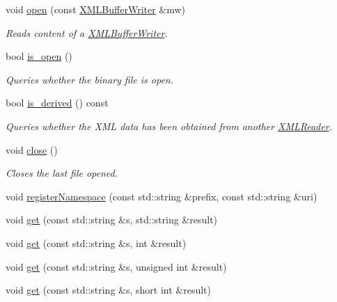 \begin{DoxyCompactItemize}
void \mbox{\hyperlink{classADATXML_1_1XMLReader_a38615b0ae22722bd15a47e27953dc77c}{open}} (const \mbox{\hyperlink{classADATXML_1_1XMLBufferWriter}{X\+M\+L\+Buffer\+Writer}} \&mw)
\begin{DoxyCompactList}\small\item\em Reads content of a \mbox{\hyperlink{classADATXML_1_1XMLBufferWriter}{X\+M\+L\+Buffer\+Writer}}. \end{DoxyCompactList}\item 
bool \mbox{\hyperlink{classADATXML_1_1XMLReader_ae9e467fca3d4bf34351dc00e9797a06f}{is\+\_\+open}} ()
\begin{DoxyCompactList}\small\item\em Queries whether the binary file is open. \end{DoxyCompactList}\item 
bool \mbox{\hyperlink{classADATXML_1_1XMLReader_a64fb149ae8809f993a7750aa5fe1f4b7}{is\+\_\+derived}} () const
\begin{DoxyCompactList}\small\item\em Queries whether the X\+ML data has been obtained from another \mbox{\hyperlink{classADATXML_1_1XMLReader}{X\+M\+L\+Reader}}. \end{DoxyCompactList}\item 
void \mbox{\hyperlink{classADATXML_1_1XMLReader_a0e5f84d85bb03e1ba3c01a20b1642a36}{close}} ()
\begin{DoxyCompactList}\small\item\em Closes the last file opened. \end{DoxyCompactList}\item 
void \mbox{\hyperlink{classADATXML_1_1XMLReader_aeb735523fc1858850ae8a2be61a34189}{register\+Namespace}} (const std\+::string \&prefix, const std\+::string \&uri)
\item 
void \mbox{\hyperlink{classADATXML_1_1XMLReader_a5ed2bbc9de7ba505e6ce37c1a5f90fee}{get}} (const std\+::string \&s, std\+::string \&result)
\item 
void \mbox{\hyperlink{classADATXML_1_1XMLReader_a39ab72e2e614e1baed6ac3de0ce9cdca}{get}} (const std\+::string \&s, int \&result)
\item 
void \mbox{\hyperlink{classADATXML_1_1XMLReader_aa716f255bed8a98d555abcf5509d75cf}{get}} (const std\+::string \&s, unsigned int \&result)
\item 
void \mbox{\hyperlink{classADATXML_1_1XMLReader_a235808802ae29fa06b6fd441f7e50ac5}{get}} (const std\+::string \&s, short int \&result)
\item 

\end{DoxyCompactItemize}
